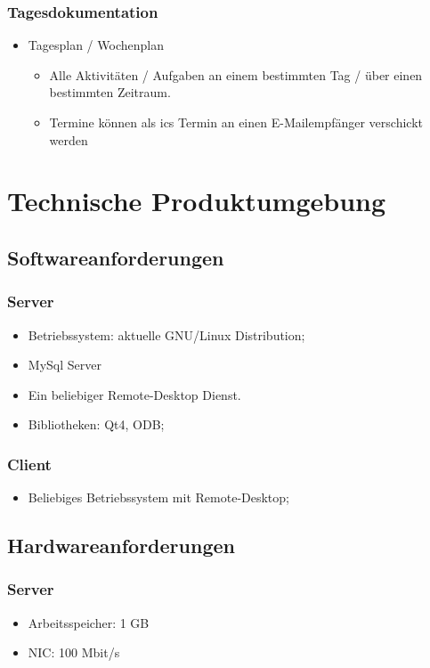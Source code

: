 \documentclass[a4paper,10pt]{article}
\begin{document}
\subsubsection{Tagesdokumentation}
\begin{itemize}
	\item Tagesplan / Wochenplan
	\begin{itemize}
		\item Alle Aktivitäten / Aufgaben an einem bestimmten Tag / über einen bestimmten Zeitraum.
		\item Termine können als ics Termin an einen E-Mailempfänger verschickt werden
	\end{itemize}
\end{itemize}


\section{Technische Produktumgebung}
\subsection{Softwareanforderungen}
\subsubsection{Server}
\begin{itemize}
	\item Betriebssystem: aktuelle GNU/Linux Distribution;
	\item MySql Server
	\item Ein beliebiger Remote-Desktop Dienst.
	\item Bibliotheken: Qt4, ODB;
\end{itemize}
\subsubsection{Client}
\begin{itemize}
	\item Beliebiges Betriebssystem mit Remote-Desktop;
\end{itemize}
\subsection{Hardwareanforderungen}
\subsubsection{Server}
\begin{itemize}
	\item Arbeitsspeicher: 1 GB
	\item NIC: 100 Mbit/s
\end{itemize}
\end{document}
